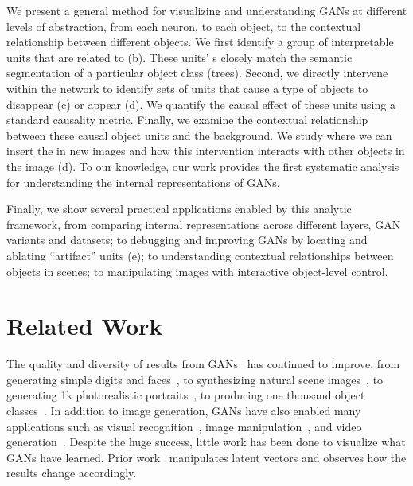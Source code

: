 \documentclass{article} %
\begin{document}
We present a general method for visualizing and understanding GANs at different levels of abstraction, from each neuron, to each object, to the contextual relationship between different objects. We first identify a group of interpretable units that are related to \concepts (b). These units' {\featuremap}s closely match the semantic segmentation of a particular object class (\eg trees). Second, we directly intervene within the network to identify sets of units that cause a type of objects to disappear (c) or appear (d). We quantify the causal effect of these units using a standard causality metric. Finally, we examine the contextual relationship between these causal object units and the background. We study where we can insert the \concepts in new images and how this intervention interacts with other objects in the image (d). To our knowledge, our work provides the first systematic analysis for understanding the internal representations of GANs.

Finally, we show several practical applications enabled by this analytic framework, from comparing internal representations across different layers, GAN variants and datasets; to debugging and improving GANs by locating and ablating ``artifact'' units (e); to understanding contextual relationships between objects in scenes; to manipulating images with interactive object-level control.
\section{Related Work} The quality and diversity of results from GANs~\citep{goodfellow2014generative} has continued to improve, from generating simple digits and faces~\citep{goodfellow2014generative}, to synthesizing natural scene images~\citep{radford2015unsupervised,denton2015deep}, to generating 1k photorealistic portraits~\citep{karras2018progressive}, to producing one thousand object classes~\citep{miyato2018spectral,zhang2018self}. In addition to image generation, GANs have also enabled many applications such as visual recognition~\citep{wang2017fast,hoffman2018cycada}, image manipulation~\citep{isola2017image,zhu2017unpaired}, and video generation~\citep{mathieu2016deep,wang2018vid2vid}. Despite the huge success, little work has been done to visualize what GANs have learned. Prior work~\citep{radford2015unsupervised,zhu2016generative} manipulates latent vectors and observes how the results change accordingly.
\end{document}
